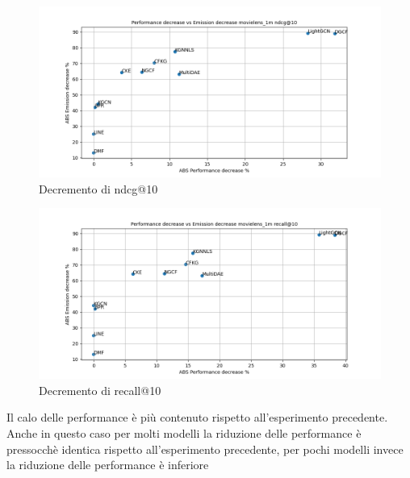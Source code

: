 \begin{figure}[H]
    \centering
    \includegraphics[scale=0.5]{images/decrement_ndcg@10_movielens_1m_40_5.png}
    \caption{Decremento di ndcg@10}
\end{figure}

\begin{figure}[H]
    \centering
    \includegraphics[scale=0.5]{images/decrement_recall@10_movielens_1m_40_5.png}
    \caption{Decremento di recall@10}
\end{figure}
\noindent Il calo delle performance è più contenuto rispetto all'esperimento precedente. Anche in questo caso per molti modelli la riduzione delle performance è pressocchè identica rispetto all'esperimento precedente, per pochi modelli invece la riduzione delle performance è inferiore